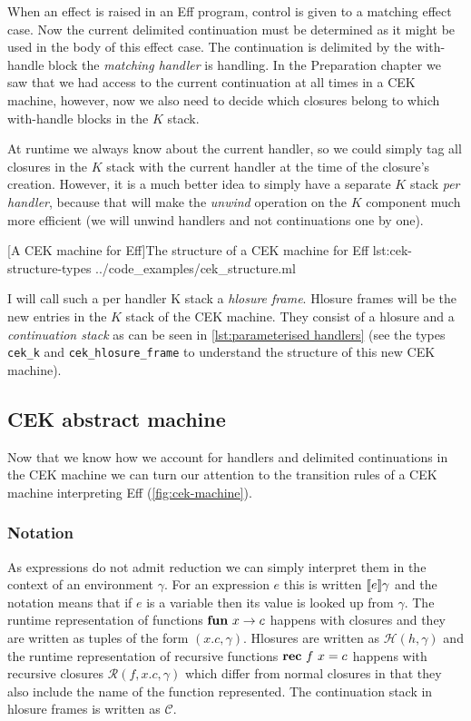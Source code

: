 \documentclass[class=article, crop=false]{standalone}
\begin{document}
When an effect is raised in an Eff program, control is given to a matching
effect case. Now the current delimited continuation must be determined as it
might be used in the body of this effect case. The continuation is delimited by
the with-handle block the \emph{matching handler} is handling. In the
Preparation chapter we saw that we had access to the current continuation at
all times in a CEK machine, however, now we also need to decide which closures
belong to which with-handle blocks in the $K$ stack.

At runtime we always know about the current handler, so we could simply tag all
closures in the $K$ stack with the current handler at the time of the closure's creation.
However, it is a much better idea to simply have a separate $K$ stack \emph{per handler},
because that will make the \emph{unwind} operation on the $K$ component
much more efficient (we will unwind handlers and not continuations one by one).

{[A CEK machine for Eff]The structure of a CEK machine for Eff}
{lst:cek-structure-types}
{../code_examples/cek_structure.ml}

I will call such a per handler K stack a \emph{hlosure frame}. Hlosure frames will be the
new entries in the $K$ stack of the CEK machine. They consist of a hlosure and
a \emph{continuation stack} as can be seen in
\autoref{lst:parameterised handlers} (see the types \lstinline|cek_k| and \lstinline|cek_hlosure_frame| to understand the structure of this new CEK machine).


\subsection{CEK abstract machine}

Now that we know how we account for handlers and delimited continuations in the
CEK machine we can turn our attention to the transition rules of a CEK machine
interpreting Eff (\autoref{fig:cek-machine}).

\subsubsection{Notation}

As expressions do not admit reduction we can simply interpret them in the
context of an environment $\gamma$. For an expression $e$ this is written
$\llbracket e \rrbracket\gamma$ and the notation means that if $e$ is a variable then its
value is looked up from $\gamma$. The runtime representation of functions
$\mathbf{fun}\  x \to c$ happens with closures and they are written as tuples of the
form $(x.c, \gamma)$. Hlosures are written as $\mathcal{H}(h, \gamma)$ and the
runtime representation of recursive functions $\mathbf{rec}\  f\ x = c$ happens with
recursive closures $\mathcal{R}(f, x.c, \gamma)$ which differ from normal
closures in that they also include the name of the function represented.
The continuation stack in hlosure frames is written as $\mathcal{C}$.
\end{document}
